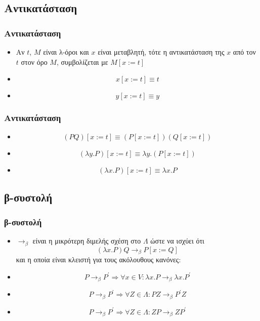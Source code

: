 \documentclass{beamer}
\begin{document}
\subsection{Αντικατάσταση}

\begin{frame}
        \frametitle{Αντικατάσταση}
        \begin{itemize}
        	\item Αν \(t\), \(M\) είναι λ-όροι και \(x\) είναι μεταβλητή, τότε η αντικατάσταση της \(x\)
            από τον \(t\) στον όρο \(M\), συμβολίζεται με \(M[x:=t]\) \\
            \pause
            \item \[x[x:=t] \equiv t\]
            \pause
            \item \[y[x:=t] \equiv y\]
                                    
        \end{itemize}
\end{frame}

\begin{frame}
        \frametitle{Αντικατάσταση}
        \begin{itemize}
        	
            \item \[(PQ)[x:=t] \equiv (P[x:=t])(Q[x:=t])\]
            \pause
            \item \[(\lambda y . P)[x:=t] \equiv \lambda y . (P[x:=t])\]
            \pause
            \item \[(\lambda x . P)[x:=t] \equiv \lambda x . P\]
            
        \end{itemize}
\end{frame}

\subsection{β-συστολή}

\begin{frame}
        \frametitle{β-συστολή}
        \begin{itemize}
        	
            \item $\rightarrow _\beta$ είναι η μικρότερη διμελής σχέση στο $\Lambda$ ώστε να ισχύει ότι 
                  \[(\lambda x . P)Q \rightarrow _\beta P[x:=Q]\]
            \pause
                  και η οποία είναι κλειστή για τους ακόλουθους κανόνες:
            \pause
            \item \[P \rightarrow _\beta P^{\prime}  \Rightarrow \forall x \in V : \lambda x . P \rightarrow _\beta \lambda x .    P^{\prime}\]
            \pause
            \item \[P \rightarrow _\beta P^{\prime}  \Rightarrow \forall Z \in \Lambda : P Z \rightarrow _\beta P^{\prime} Z\]
			\pause
            \item \[P \rightarrow _\beta P^{\prime}  \Rightarrow \forall Z \in \Lambda : Z P \rightarrow _\beta Z P^{\prime}\]
            
        \end{itemize}
\end{frame}
\end{document}
